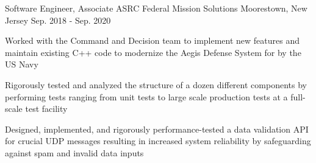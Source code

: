 \begin{cventries}
{\begin{cvitems}
      \end{cvitems} 
    }  
  \cventry
    {Software Engineer, Associate}
    {ASRC Federal Mission Solutions}
    {Moorestown, New Jersey}
    {Sep. 2018 - Sep. 2020}
    {
      \begin{cvitems}
        \item {Worked with the Command and Decision team to implement new features and maintain existing C++ code to modernize the Aegis Defense System for by the US Navy}
        \item {Rigorously tested and analyzed the structure of a dozen different components by performing tests ranging from unit tests to large scale production tests at a full-scale test facility}
        \item {Designed, implemented, and rigorously performance-tested a data validation API for crucial UDP messages resulting in increased system reliability by safeguarding against spam and invalid data inputs}
      \end{cvitems} 
    }  
\end{cventries}
